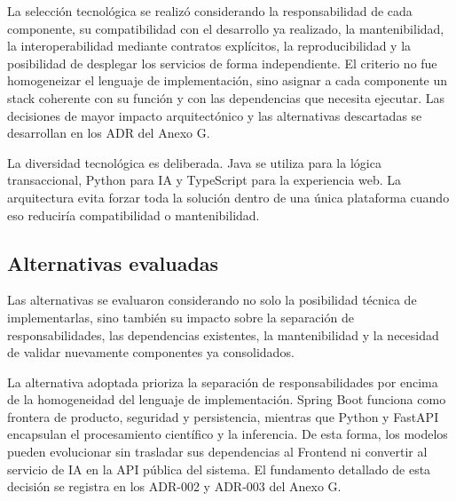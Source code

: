 La selección tecnológica se realizó considerando la responsabilidad de cada componente, su compatibilidad con el desarrollo ya realizado, la mantenibilidad, la interoperabilidad mediante contratos explícitos, la reproducibilidad y la posibilidad de desplegar los servicios de forma independiente. El criterio no fue homogeneizar el lenguaje de implementación, sino asignar a cada componente un stack coherente con su función y con las dependencias que necesita ejecutar. Las decisiones de mayor impacto arquitectónico y las alternativas descartadas se desarrollan en los ADR del Anexo G.


La diversidad tecnológica es deliberada. Java se utiliza para la lógica transaccional, Python para IA y TypeScript para la experiencia web. La arquitectura evita forzar toda la solución dentro de una única plataforma cuando eso reduciría compatibilidad o mantenibilidad.

\subsection{Alternativas evaluadas}

Las alternativas se evaluaron considerando no solo la posibilidad técnica de implementarlas, sino también su impacto sobre la separación de responsabilidades, las dependencias existentes, la mantenibilidad y la necesidad de validar nuevamente componentes ya consolidados.


La alternativa adoptada prioriza la separación de responsabilidades por encima de la homogeneidad del lenguaje de implementación. Spring Boot funciona como frontera de producto, seguridad y persistencia, mientras que Python y FastAPI encapsulan el procesamiento científico y la inferencia. De esta forma, los modelos pueden evolucionar sin trasladar sus dependencias al Frontend ni convertir al servicio de IA en la API pública del sistema. El fundamento detallado de esta decisión se registra en los ADR-002 y ADR-003 del Anexo G.

